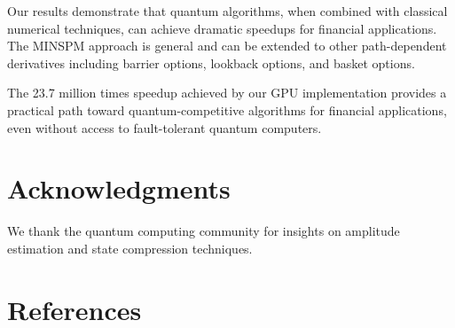 \documentclass[12pt]{article}
\begin{document}
Our results demonstrate that quantum algorithms, when combined with classical numerical techniques, can achieve dramatic speedups for financial applications. The MINSPM approach is general and can be extended to other path-dependent derivatives including barrier options, lookback options, and basket options.

The 23.7 million times speedup achieved by our GPU implementation provides a practical path toward quantum-competitive algorithms for financial applications, even without access to fault-tolerant quantum computers.

\section*{Acknowledgments}

We thank the quantum computing community for insights on amplitude estimation and state compression techniques.

\section*{References}
\end{document}
